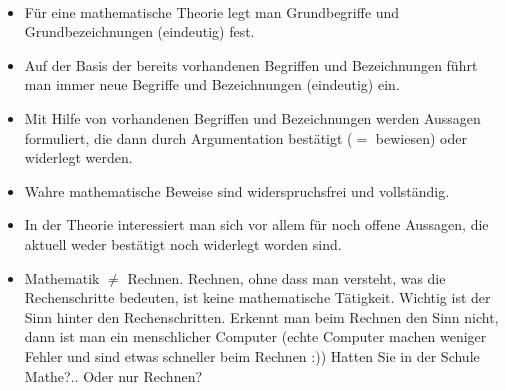 \begin{bem}\ 
\begin{itemize}
		\item Für eine mathematische Theorie legt man Grundbegriffe und Grundbezeichnungen (eindeutig) fest. 
		\item Auf der Basis der bereits vorhandenen Begriffen und Bezeichnungen führt man immer neue Begriffe und Bezeichnungen (eindeutig) ein. 
		\item Mit Hilfe von vorhandenen Begriffen und Bezeichnungen werden Aussagen formuliert, die dann durch Argumentation bestätigt ($=$ bewiesen) oder widerlegt werden. 
		\item Wahre mathematische Beweise sind widerspruchsfrei und vollständig. 
		\item In der Theorie interessiert man sich vor allem für noch offene Aussagen, die aktuell weder bestätigt noch widerlegt worden sind. 
		\item Mathematik $\ne$ Rechnen. Rechnen, ohne dass man versteht, was die Rechenschritte bedeuten, ist keine mathematische Tätigkeit. Wichtig ist der Sinn hinter den Rechenschritten. Erkennt man beim Rechnen den Sinn nicht, dann ist man ein menschlicher Computer (echte Computer machen weniger Fehler und sind etwas schneller beim Rechnen :)) Hatten Sie in der Schule Mathe?.. Oder nur Rechnen? 
\end{itemize} 
\end{bem} 


 
 
 

\appendix 






%
%

